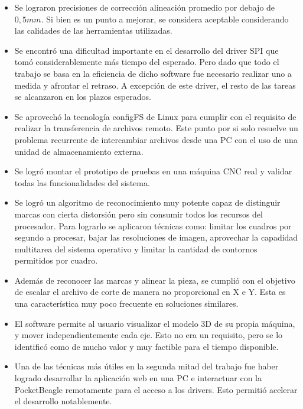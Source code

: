 \begin{itemize}
   \item{Se lograron precisiones de corrección alineación promedio por debajo de $0,5 mm$. Si bien es un punto a mejorar, se considera aceptable considerando las calidades de las herramientas utilizadas.}

   \item{Se encontró una dificultad importante en el desarrollo del driver SPI que tomó considerablemente más tiempo del esperado. Pero dado que todo el trabajo se basa en la eficiencia de dicho software fue necesario realizar uno a medida y afrontar el retraso. A excepción de este driver, el resto de las tareas se alcanzaron en los plazos esperados.}
   
   \item{Se aprovechó la tecnología configFS de Linux para cumplir con el requisito de realizar la transferencia de archivos remoto. Este punto por si solo resuelve un problema recurrente de intercambiar archivos desde una PC con el uso de una unidad de almacenamiento externa.}

   \item{Se logró montar el prototipo de pruebas en una máquina CNC real y validar todas las funcionalidades del sistema.}

   \item{Se logró un algoritmo de reconocimiento muy potente capaz de distinguir marcas con cierta distorsión pero sin consumir todos los recursos del procesador.  Para lograrlo se aplicaron técnicas como: limitar los cuadros por segundo a procesar, bajar las resoluciones de imagen, aprovechar la capadidad multitarea del sistema operativo y limitar la cantidad de contornos permitidos por cuadro.}

   \item{Además de reconocer las marcas y alinear la pieza, se cumplió con el objetivo de escalar el archivo de corte de manera no proporcional en X e Y. Esta es una característica muy poco frecuente en soluciones similares.}

   \item{El software permite al usuario visualizar el modelo 3D de su propia máquina, y mover independientemente cada eje. Esto no era un requisito, pero se lo identificó como de mucho valor y muy factible para el tiempo disponible.}

   \item{Una de las técnicas más útiles en la segunda mitad del trabajo fue haber logrado desarrollar la aplicación web en una PC e interactuar con la PocketBeagle remotamente para el acceso a los drivers. Esto permitió acelerar el desarrollo notablemente.}

\end{itemize}

